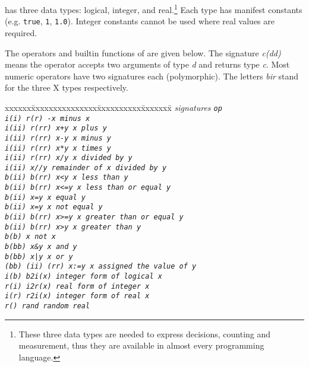  has three data types: logical, integer, and 
real.\footnote{These three data types are needed to express decisions, 
counting and measurement, thus they are available in almost every 
programming language.}  
Each type has manifest constants (e.g. {\tt true}, {\tt 1}, {\tt 1.0}).  
Integer constants cannot be used where real values are required.

The operators and builtin functions of  are given below.  
The signature {\em c(dd)} means the operator accepts two arguments of type 
{\em d} and returns type {\em c}.  
Most numeric operators have two signatures each (polymorphic).  
The letters {\em bir\/} stand for the three X types respectively.

\begin{tt}
\begin{tabbing}
xxxxxx\=xxxxxxxxxxxxxxx\=xxxxxxxxxx\=xxxxxxx\=\kill
\>\em signatures        \>\tt op                       \\
\>\em i(i)  r(r)        \>-x     \>   {\rm minus} x                   \\
\>\em i(ii) r(rr)       \>x+y    \>x  {\rm plus} y                    \\
\>\em i(ii) r(rr)       \>x-y    \>x  {\rm minus} y                   \\
\>\em i(ii) r(rr)       \>x*y    \>x  {\rm times} y                   \\
\>\em i(ii) r(rr)       \>x/y    \>x  {\rm divided by} y              \\ 
\>\em i(ii)             \>x//y   \>   {\rm remainder of} x {\rm divided by} y \\
\>\em b(ii) b(rr)       \>x<y    \>x  {\rm less than} y               \\
\>\em b(ii) b(rr)       \>x<=y   \>x  {\rm less than or equal} y      \\
\>\em b(ii)             \>x=y    \>x  {\rm equal} y                   \\
\>\em b(ii)             \>x\tw=y \>x  {\rm not equal} y               \\
\>\em b(ii) b(rr)       \>x>=y   \>x  {\rm greater than or equal} y   \\
\>\em b(ii) b(rr)       \>x>y    \>x  {\rm greater than} y            \\
\>\em b(b)              \>\tw x  \>   {\rm not} x                     \\
\>\em b(bb)             \>x\&y   \>x  {\rm and} y                     \\
\>\em b(bb)             \>x|y    \>x  {\rm or} y                      \\
\>\em (bb) (ii) (rr)    \>x:=y   \>x  {\rm assigned the value of} y   \\
\>\em i(b)              \>b2i(x) \>   {\rm integer form of logical} x \\
\>\em r(i)              \>i2r(x) \>   {\rm real form of integer} x    \\
\>\em i(r)              \>r2i(x) \>   {\rm integer form of real} x    \\
\>\em r()               \>rand   \>   {\rm random real}
\end{tabbing}
\end{tt}


